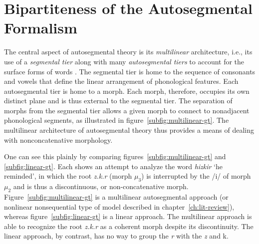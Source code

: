\section{Bipartiteness of the Autosegmental Formalism}\label{sec:autoseg-bipart}
The central aspect of autosegmental theory 
is its \emph{multilinear} architecture, i.e., its use of a 
\emph{segmental tier} along with many \emph{autosegmental tiers} to 
account for the surface forms of words \citet{mccarthy:1981}. The segmental tier is home to the sequence of consonants and vowels that define the linear arrangement of phonological features. Each autosegmental tier is home to a morph. Each morph, therefore, occupies its own distinct plane and is thus external to the segmental tier. The separation of morphs from the segmental tier allows a given morph to connect to nonadjacent phonological segments, as illustrated in figure~\ref{subfig:multilinear-gt}. 
The multilinear architecture of autosegmental theory thus provides a means of
dealing with nonconcatenative morphology. 

One can see this plainly by comparing figures~\ref{subfig:multilinear-gt} and 
\ref{subfig:linear-gt}. Each shows an attempt to analyze the word \emph{hizkir} `he reminded', 
in which the root \textit{z.k.r} (morph $\mu_3$) is interrupted by the /i/ of morph 
$\mu_2$ and is thus a discontinuous, or non-concatenative morph. 
Figure~\ref{subfig:multilinear-gt} is a multilinear autosegmental approach 
(or nonlinear nonsequential type of model described in chapter~\ref{ch:lit-review}), 
whereas figure~\ref{subfig:linear-gt} is a linear approach. The multilinear approach 
is able to recognize the root \textit{z.k.r} as a coherent morph despite its discontinuity. 
The linear approach, by contrast, has no way to group the \textit{r} with the \textit{z} and {k}.


